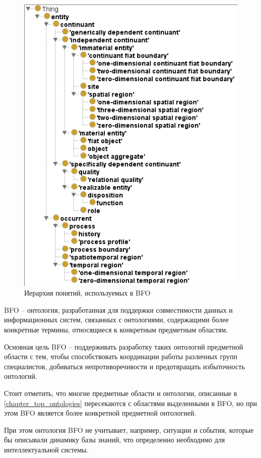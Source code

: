 \begin{figure}[H]
	\includegraphics[scale=0.6]{author/part2/figures/chapter_kb/bfo.png}
	\caption{Иерархия понятий, используемых в BFO}
	\label{fig:bfo}
\end{figure}

BFO -- онтология, разработанная для поддержки совместимости данных и информационных систем, связанных с онтологиями, содержащими более конкретные термины, относящиеся к конкретным предметным областям.

Основная цель BFO -- поддерживать разработку таких онтологий предметной области с тем, чтобы способствовать координации работы различных групп специалистов, добиваться непротиворечивости и предотвращать избыточность онтологий.

Стоит отметить, что многие предметные области и онтологии, описанные в \ref{chapter_top_ontologies} пересекаются с областями выделенными в BFO, но при этом BFO является более конкретной предметной онтологией. 

При этом онтология BFO не учитывает, например, ситуации и события, которые бы описывали динамику базы знаний, что определенно необходимо для интеллектуальной системы.

